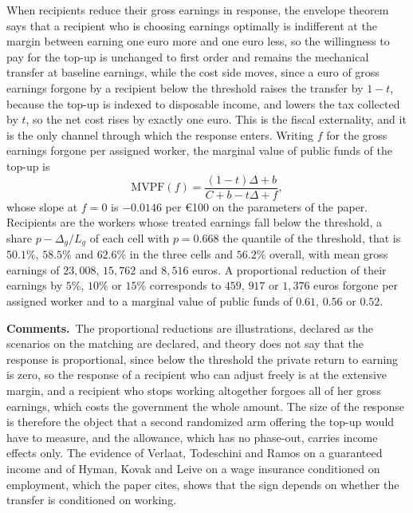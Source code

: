 \documentclass[11pt,a4paper]{article}
\theoremstyle{notesplain}
\theoremstyle{notesupright}
\numberwithin{equation}{section}
\newcommand{\comments}{\par\smallskip\noindent\textbf{Comments.}\ }
\begin{document}
When recipients reduce their gross earnings in response, the envelope theorem says that a recipient who is choosing earnings optimally is indifferent at the margin between earning one euro more and one euro less, so the willingness to pay for the top-up is unchanged to first order and remains the mechanical transfer at baseline earnings, while the cost side moves, since a euro of gross earnings forgone by a recipient below the threshold raises the transfer by $1-t$, because the top-up is indexed to disposable income, and lowers the tax collected by $t$, so the net cost rises by exactly one euro. This is the fiscal externality, and it is the only channel through which the response enters. Writing $f$ for the gross earnings forgone per assigned worker, the marginal value of public funds of the top-up is
\begin{equation}
\mathrm{MVPF}(f)=\frac{(1-t)\Delta+b}{C+b-t\Delta+f},
\end{equation}
whose slope at $f=0$ is $-0.0146$ per €100 on the parameters of the paper. Recipients are the workers whose treated earnings fall below the threshold, a share $p-\Delta_g/L_g$ of each cell with $p=0.668$ the quantile of the threshold, that is $50.1\%$, $58.5\%$ and $62.6\%$ in the three cells and $56.2\%$ overall, with mean gross earnings of $23{,}008$, $15{,}762$ and $8{,}516$ euros. A proportional reduction of their earnings by $5\%$, $10\%$ or $15\%$ corresponds to $459$, $917$ or $1{,}376$ euros forgone per assigned worker and to a marginal value of public funds of $0.61$, $0.56$ or $0.52$.

\comments The proportional reductions are illustrations, declared as the scenarios on the matching are declared, and theory does not say that the response is proportional, since below the threshold the private return to earning is zero, so the response of a recipient who can adjust freely is at the extensive margin, and a recipient who stops working altogether forgoes all of her gross earnings, which costs the government the whole amount. The size of the response is therefore the object that a second randomized arm offering the top-up would have to measure, and the allowance, which has no phase-out, carries income effects only. The evidence of Verlaat, Todeschini and Ramos \cite{verlaat} on a guaranteed income and of Hyman, Kovak and Leive \cite{hyman} on a wage insurance conditioned on employment, which the paper cites, shows that the sign depends on whether the transfer is conditioned on working.
\end{document}
